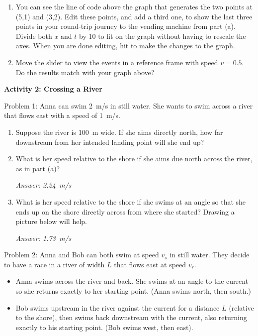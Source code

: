 \begin{enumerate}[labparts]
\item You can see the line of code above the graph that generates the two points at (5,1) and (3,2).  Edit these points, and add a third one, to show the last three points in your round-trip journey to the vending machine from part (a).  Divide both $x$ and $t$ by 10 to fit on the graph without having to rescale the axes.  When you are done editing, hit  to make the changes to the graph.

\item Move the slider to view the events in a reference frame with speed $v=0.5$.  Do the results match with your graph above?

\end{enumerate}

\bigskip
\textbf{Activity 2: Crossing a River} 

Problem 1: Anna can swim 2~m/s in still water.  She wants to swim across a river that flows east with a speed of 1~m/s.

\begin{enumerate}[labparts]
\item Suppose the river is 100~m wide.  If she aims directly north, how far downstream from her intended landing point will she end up?
\answerspace{0.6in}

\item What is her speed relative to the shore if she aims due north across the river, as in part (a)?
\answerspace{0.6in}

\hspace{\fill}\textit{Answer: 2.24~m/s}

\item What is her speed relative to the shore if she swims at an angle so that she ends up on the shore directly across from where she started?  Drawing a picture below will help.
\answerspace{0.6in}

\hspace{\fill}\textit{Answer: 1.73~m/s}

\end{enumerate}

Problem 2: Anna and Bob can both swim at speed $v_s$ in still water.  They decide to have a race in a river of width $L$ that flows east at speed $v_r$.
\begin{itemize}[nosep]
\item Anna swims across the river and back.  She swims at an angle to the current so she returns   exactly to her starting point.  (Anna swims north, then south.)
\item Bob swims upstream in the river against the current for a distance $L$ (relative to the shore), then swims back downstream with the current, also returning exactly to his starting point. (Bob swims west, then east).
\end{itemize}

